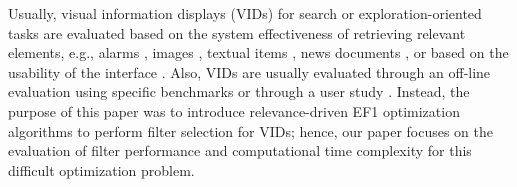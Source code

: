  Usually, visual information displays (VIDs) for search or exploration-oriented tasks are evaluated based on the system effectiveness of retrieving relevant elements, e.g., alarms \cite{Amershi2011}, images \cite{Cui2008b,Fogarty2008}, textual items \cite{Tsandilas2005}, news documents \cite{Schrier2008}, 
or based on the usability of the interface \cite{Gajos2008,Gajos2010,Hartmann2008}.
Also, VIDs are usually evaluated through an off-line evaluation using specific benchmarks \cite{Amershi2011,Cui2008b,Harold2017}  or through a user study \cite{Amershi2011,Gajos2008,Hartmann2008,Fogarty2008,Tsandilas2005,Gajos2010}.
Instead, the purpose of this paper was to introduce  relevance-driven EF1 optimization algorithms to perform filter selection for VIDs; hence, our paper focuses on the evaluation of filter performance and computational time complexity for this difficult optimization problem.








